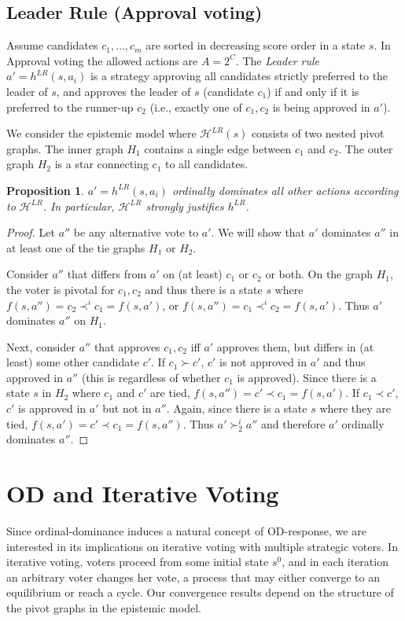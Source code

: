 \documentclass[letterpaper]{article} %
\def\calH{\mathcal{H}}
\newtheorem{proposition}[theorem]{Proposition}
\begin{document}
\subsection{Leader Rule (Approval voting)} Assume candidates $c_1,\ldots,c_m$ are sorted in decreasing score order in a state $s$. In Approval voting the allowed actions are $A=2^C$. The \emph{Leader rule}~\cite{Las09} $a'=h^{LR}(s,a_i)$ is a strategy approving all candidates strictly preferred to the leader of $s$, and approves the leader of $s$ (candidate $c_1$) if and only if it is preferred to the runner-up $c_2$ (i.e., exactly one of $c_1,c_2$ is being approved in $a'$).

We consider the epistemic model where $\calH^{LR}(s)$ consists of two nested pivot graphs. The inner graph $H_1$ contains a single edge between $c_1$ and $c_2$. The outer graph $H_2$ is a star connecting $c_1$ to all candidates.

\begin{proposition} $a'=h^{LR}(s,a_i)$ ordinally dominates all other actions according to $\calH^{LR}$. In particular, $\calH^{LR}$ strongly justifies $h^{LR}$.
\end{proposition}
\begin{proof}
Let $a''$ be any alternative vote to $a'$. We will show that $a'$ dominates $a''$ in at least one of the tie graphs $H_1$ or $H_2$.

Consider $a''$ that differs from $a'$ on (at least) $c_1$ or $c_2$ or both. On the graph $H_1$, the voter is pivotal for $c_1,c_2$ and thus there is a state $s$ where $f(s,a'')=c_2 \prec^{i} c_1 = f(s,a')$, or $f(s,a'')=c_1 \prec^{i} c_2 = f(s,a')$. Thus $a'$ dominates $a''$ on $H_1$.

Next, consider $a''$ that approves $c_1,c_2$ iff $a'$ approves them, but differs in (at least) some other candidate $c'$. If $c_1\succ c'$, $c'$ is not approved in $a'$ and thus approved in $a''$ (this is regardless of whether $c_1$ is approved). Since there is a state $s$ in $H_2$ where $c_{1}$ and $c'$ are tied, $f(s,a'')=c' \prec c_1 = f(s,a')$. If $c_1\prec c'$, $c'$ is approved in $a'$ but not in $a''$. Again, since there is a state $s$ where they are tied, $f(s,a')=c' \prec c_1 = f(s,a'')$.
Thus $a' \succ^i_2 a''$ and therefore $a'$ ordinally dominates $a''$.
\end{proof}

\section{OD and Iterative Voting}
Since ordinal-dominance induces a natural concept of OD-response, we are interested in its implications on iterative voting with multiple strategic voters.
In iterative voting, voters proceed from some initial state $s^{0}$, and in each iteration an arbitrary voter changes her vote, a process that may either converge to an equilibrium or reach a cycle. Our convergence results depend on the structure of the pivot graphs in the epistemic model.
\end{document}
